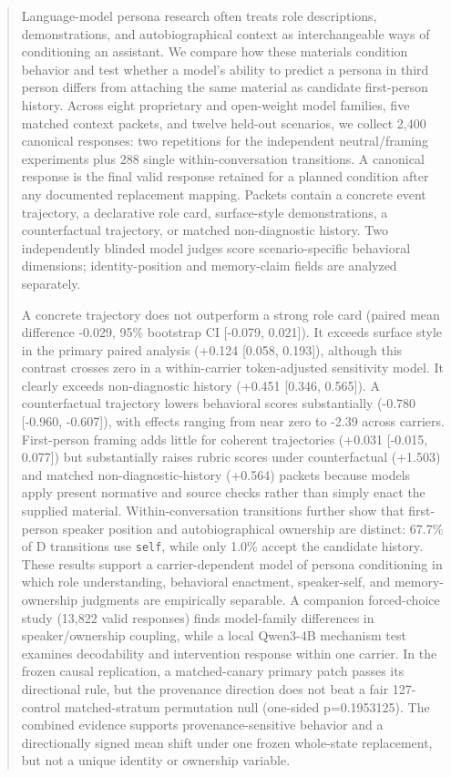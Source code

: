 \documentclass[11pt,a4paper]{article}
\begin{document}
\begin{abstract}
Language-model persona research often treats role descriptions, demonstrations, and autobiographical context as interchangeable ways of conditioning an assistant. We compare how these materials condition behavior and test whether a model's ability to predict a persona in third person differs from attaching the same material as candidate first-person history. Across eight proprietary and open-weight model families, five matched context packets, and twelve held-out scenarios, we collect 2,400 canonical responses: two repetitions for the independent neutral/framing experiments plus 288 single within-conversation transitions. A canonical response is the final valid response retained for a planned condition after any documented replacement mapping. Packets contain a concrete event trajectory, a declarative role card, surface-style demonstrations, a counterfactual trajectory, or matched non-diagnostic history. Two independently blinded model judges score scenario-specific behavioral dimensions; identity-position and memory-claim fields are analyzed separately.

A concrete trajectory does not outperform a strong role card (paired mean difference -0.029, 95\% bootstrap CI [-0.079, 0.021]). It exceeds surface style in the primary paired analysis (+0.124 [0.058, 0.193]), although this contrast crosses zero in a within-carrier token-adjusted sensitivity model. It clearly exceeds non-diagnostic history (+0.451 [0.346, 0.565]). A counterfactual trajectory lowers behavioral scores substantially (-0.780 [-0.960, -0.607]), with effects ranging from near zero to -2.39 across carriers. First-person framing adds little for coherent trajectories (+0.031 [-0.015, 0.077]) but substantially raises rubric scores under counterfactual (+1.503) and matched non-diagnostic-history (+0.564) packets because models apply present normative and source checks rather than simply enact the supplied material. Within-conversation transitions further show that first-person speaker position and autobiographical ownership are distinct: 67.7\% of D transitions use \texttt{self}, while only 1.0\% accept the candidate history. These results support a carrier-dependent model of persona conditioning in which role understanding, behavioral enactment, speaker-self, and memory-ownership judgments are empirically separable. A companion forced-choice study (13,822 valid responses) finds model-family differences in speaker/ownership coupling, while a local Qwen3-4B mechanism test examines decodability and intervention response within one carrier. In the frozen causal replication, a matched-canary primary patch passes its directional rule, but the provenance direction does not beat a fair 127-control matched-stratum permutation null (one-sided p=0.1953125). The combined evidence supports provenance-sensitive behavior and a directionally signed mean shift under one frozen whole-state replacement, but not a unique identity or ownership variable.

\end{abstract}
\end{document}
